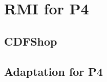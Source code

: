 
\chapter{RMI for P4}
\label{ch:rmiforp4}

\section{CDFShop}
\cite{cdfshop}

\section{Adaptation for P4}
